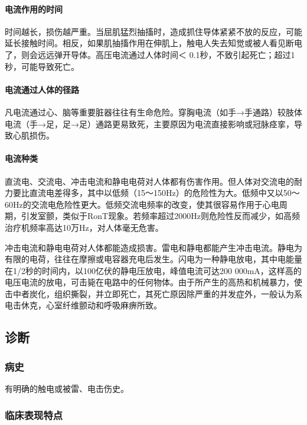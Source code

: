 \paragraph{电流作用的时间}

时间越长，损伤越严重。当屈肌猛烈抽搐时，造成抓住导体紧紧不放的反应，可能延长接触时间。相反，如果肌抽搐作用在伸肌上，触电人失去知觉或被人看见断电了，则会远远弹开导体。高压电流通过人体时间＜
0.1秒，不致引起死亡；超过1秒，可能导致死亡。

\paragraph{电流通过人体的径路}

凡电流通过心、脑等重要脏器往往有生命危险。穿胸电流（如手→手通路）较肢体电流（手→足，足→足）通路更易致死，主要原因为电流直接影响或冠脉痉挛，导致心肌损伤。

\paragraph{电流种类}

直流电、交流电、冲击电流和静电电荷对人体都有伤害作用。但人体对交流电的耐力要比直流电差得多，其中以低频（15～150Hz）的危险性为大。低频中又以50～60Hz的交流电危险性更大。低频交流电频率的改变，使其很容易作用于心电周期，引发室颤，类似于RonT现象。若频率超过2000Hz则危险性反而减少，如高频治疗机频率高达10万Hz，对人体毫无危害。

冲击电流和静电电荷对人体都能造成损害。雷电和静电都能产生冲击电流。静电为有限的电荷，往往在摩擦或电容器充电后发生。闪电为一种静电放电，其中电能量在1/2秒的时间内，以100亿伏的静电压放电，峰值电流可达200
000mA，这样高的电压电流的放电，可击毙在电路中的任何物体。由于所产生的高热和机械暴力，使击中者炭化，组织撕裂，并立即死亡，其死亡原因除严重的并发症外，一般认为系电击休克，心室纤维颤动和呼吸麻痹所致。

\subsection{诊断}

\subsubsection{病史}

有明确的触电或被雷、电击伤史。

\subsubsection{临床表现特点}

